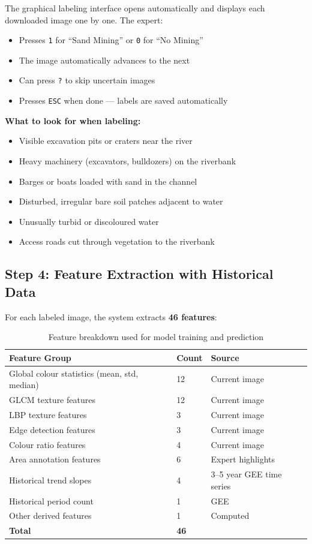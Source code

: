 \documentclass[12pt, a4paper]{article}
\begin{document}
The graphical labeling interface opens automatically and displays
each downloaded image one by one. The expert:

\begin{itemize}[noitemsep]
  \item Presses \texttt{1} for ``Sand Mining'' or \texttt{0} for ``No Mining''
  \item The image automatically advances to the next
  \item Can press \texttt{?} to skip uncertain images
  \item Presses \texttt{ESC} when done --- labels are saved automatically
\end{itemize}

\textbf{What to look for when labeling:}
\begin{itemize}[noitemsep]
  \item Visible excavation pits or craters near the river
  \item Heavy machinery (excavators, bulldozers) on the riverbank
  \item Barges or boats loaded with sand in the channel
  \item Disturbed, irregular bare soil patches adjacent to water
  \item Unusually turbid or discoloured water
  \item Access roads cut through vegetation to the riverbank
\end{itemize}

\subsection{Step 4: Feature Extraction with Historical Data}

For each labeled image, the system extracts \textbf{46 features}:

\begin{table}[H]
\centering
\begin{tabular}{lll}
\toprule
\textbf{Feature Group} & \textbf{Count} & \textbf{Source} \\
\midrule
Global colour statistics (mean, std, median) & 12 & Current image \\
GLCM texture features & 12 & Current image \\
LBP texture features & 3 & Current image \\
Edge detection features & 3 & Current image \\
Colour ratio features & 4 & Current image \\
Area annotation features & 6 & Expert highlights \\
Historical trend slopes & 4 & 3--5 year GEE time series \\
Historical period count & 1 & GEE \\
Other derived features & 1 & Computed \\
\midrule
\textbf{Total} & \textbf{46} & \\
\bottomrule
\end{tabular}
\caption{Feature breakdown used for model training and prediction}
\end{table}
\end{document}
